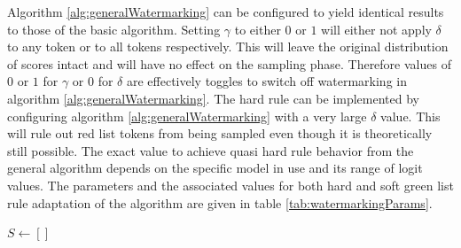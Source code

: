     Algorithm \ref{alg:generalWatermarking} can be configured to yield identical results to those of the basic algorithm.
    Setting $\gamma$ to either $0$ or $1$ will either not apply $\delta$ to any token or to all tokens respectively.
    This will leave the original distribution of scores intact and will have no effect on the sampling phase.
    Therefore values of $0$ or $1$ for $\gamma$ or $0$ for $\delta$ are effectively toggles to switch off watermarking in algorithm \ref{alg:generalWatermarking}.
    The hard rule can be implemented by configuring algorithm \ref{alg:generalWatermarking} with a very large $\delta$ value. 
    This will rule out red list tokens from being sampled even though it is theoretically still possible.
    The exact value to achieve quasi hard rule behavior from the general algorithm depends on the specific model in use and its range of logit values.
    The parameters and the associated values for both hard and soft green list rule adaptation of the algorithm are given in table \ref{tab:watermarkingParams}.

	\begin{algorithm}
        \caption{General Watermarking Algorithm\label{alg:generalWatermarking}}
        \DontPrintSemicolon
		\SetAlgoLined
        $S \gets []$ 	
    \end{algorithm}

